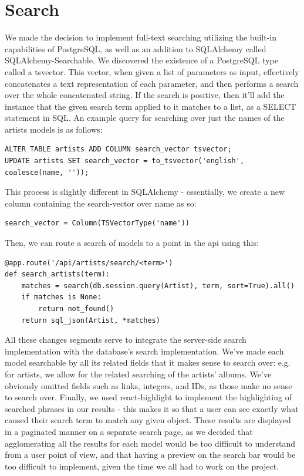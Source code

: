 \documentclass{scrartcl}
\begin{document}
    \section{Search}\label{sec:search}
    We made the decision to implement full-text searching utilizing the built-in capabilities of PostgreSQL, as well as an addition to SQLAlchemy called SQLAlchemy-Searchable.
    We discovered the existence of a PostgreSQL type called a tsvector.
    This vector, when given a list of parameters as input, effectively concatenates a text representation of each parameter, and then performs a search over the whole concatenated string.
    If the search is positive, then it'll add the instance that the given search term applied to it matches to a list, as a SELECT statement in SQL.
    An example query for searching over just the names of the artists models is as follows:
    \begin{verbatim}
ALTER TABLE artists ADD COLUMN search_vector tsvector;
UPDATE artists SET search_vector = to_tsvector('english', coalesce(name, ''));
    \end{verbatim}

    This process is slightly different in SQLAlchemy - essentially, we create a new column containing the search-vector over name as so:\\
    \begin{verbatim}
search_vector = Column(TSVectorType('name'))
    \end{verbatim}
    Then, we can route a search of models to a point in the api using this:
    \begin{verbatim}
@app.route('/api/artists/search/<term>')
def search_artists(term):
    matches = search(db.session.query(Artist), term, sort=True).all()
    if matches is None:
        return not_found()
    return sql_json(Artist, *matches)
    \end{verbatim}


    All these changes segments serve to integrate the server-side search implementation with the database's search implementation.
    We've made each model searchable by all its related fields that it makes sense to search over: e.g. for artists, we allow for the related searching of the artists' albums.
    We've obviously omitted fields such as links, integers, and IDs, as those make no sense to search over.
    Finally, we used react-highlight to implement the highlighting of searched phrases in our results - this makes it so that a user can see exactly what caused their search term to match any given object.
    These results are displayed in a paginated manner on a separate search page, as we decided that agglomerating all the results for each model would be too difficult to understand from a user point of view, and that having a preview on the search bar would be too difficult to implement, given the time we all had to work on the project.
\end{document}
